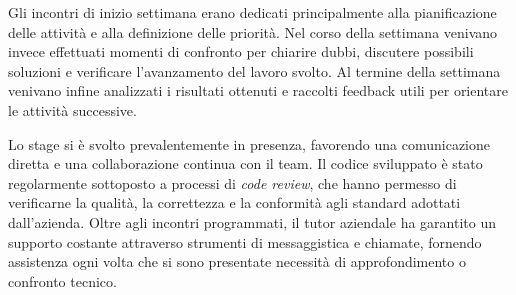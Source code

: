 Gli incontri di inizio settimana erano dedicati principalmente alla pianificazione delle attività e alla definizione delle priorità. Nel corso della settimana venivano invece effettuati momenti di confronto per chiarire dubbi, discutere possibili soluzioni e verificare l'avanzamento del lavoro svolto. Al termine della settimana venivano infine analizzati i risultati ottenuti e raccolti feedback utili per orientare le attività successive.

Lo stage si è svolto prevalentemente in presenza, favorendo una comunicazione diretta e una collaborazione continua con il team. Il codice sviluppato è stato regolarmente sottoposto a processi di \textit{code review}, che hanno permesso di verificarne la qualità, la correttezza e la conformità agli standard adottati dall'azienda. Oltre agli incontri programmati, il tutor aziendale ha garantito un supporto costante attraverso strumenti di messaggistica e chiamate, fornendo assistenza ogni volta che si sono presentate necessità di approfondimento o confronto tecnico.

\newpage